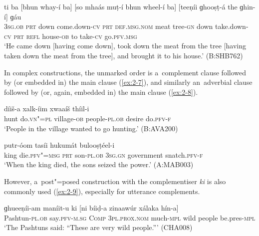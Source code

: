 \begin{exe}
\ex
\label{ex:2-6}
\gll ti ba [bhun whay-í ba] [so mhaás muṭ-í bhun wheel-í ba] [teeṇíi ɡhooṣṭ-á the ɡhin-í] ɡáu \\
\textsc{3sg.ob} \textsc{prt} down come.down-\textsc{cv} \textsc{prt} \textsc{def.msg.nom} meat tree-\textsc{gn} down take.down-\textsc{cv} \textsc{prt} \textsc{refl} house-\textsc{ob} to take-\textsc{cv} go.\textsc{pfv.msg} \\
\glt `He came down [having come down], took down the meat from the tree [having taken down the meat from the tree], and brought it to his house.' (B:SHB762)
\end{exe}

In complex constructions, the unmarked order is a~complement clause followed by (or embedded in) the main clause (\ref{ex:2-7}), and similarly an~adverbial clause followed by (or, again, embedded in) the main clause (\ref{ex:2-8}). 

\begin{exe}
\ex
\label{ex:2-7}
 díiš-a xalk-íim xwaaíš thíil-i \\
	hunt do.\textsc{vn"=pl} village\textsc{-ob} people\textsc{-pl.ob} desire do.\textsc{pfv-f} \\
\glt `People in the village wanted to go hunting.' (B:AVA200)
\end{exe}

\begin{exe}
\ex
\label{ex:2-8}
 putr-óom tasíi hukumát bulooṣṭéel-i \\
	king die.\textsc{pfv"=msg} \textsc{prt} son\textsc{-pl.ob} \textsc{3sg.gn} government snatch.\textsc{pfv-f} \\
\glt `When the king died, the sons seized the power.' (A:MAB003)
\end{exe}

However, a~post"=posed construction with the complementiser \textit{ki} is also commonly used (\ref{ex:2-9}), especially for utterance complements.

\begin{exe}
\ex
\label{ex:2-9}
\gll ɡhueeṇíi-am maníit-u ki [ni bíiḍ-a zinaawúr xálaka hín-a] \\
	Pashtun-\textsc{pl.ob} say.\textsc{pfv-m.sg} \textsc{Comp} \textsc{3pl.prox.nom} much-\textsc{mpl} wild people be.pres-\textsc{mpl} \\
\glt `The Pashtuns said: ``These are very wild people.''' (CHA008)
\end{exe}

